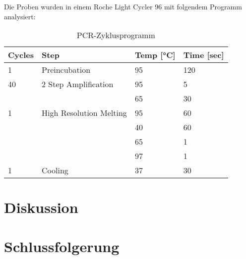 \documentclass{article}
\begin{document}
Die Proben wurden in einem Roche Light Cycler 96 mit folgendem Programm analysiert:

\begin{table}[H]
\centering
\begin{tabular}{|l|l|l|l|}
\hline
\textbf{Cycles} & \textbf{Step} & \textbf{Temp [°C]} & \textbf{Time [sec]} \\ \hline
1 & Preincubation & 95 & 120 \\ \hline
40 & 2 Step Amplification & 95 & 5 \\ \hline
 &  & 65 & 30 \\ \hline
1 & High Resolution Melting & 95 & 60 \\ \hline
 &  & 40 & 60 \\ \hline
 &  & 65 & 1 \\ \hline
 &  & 97 & 1 \\ \hline
1 & Cooling & 37 & 30 \\ \hline
\end{tabular}
\caption{PCR-Zyklusprogramm}
\end{table}

\section{Diskussion}

\section{Schlussfolgerung}



\end{document}
